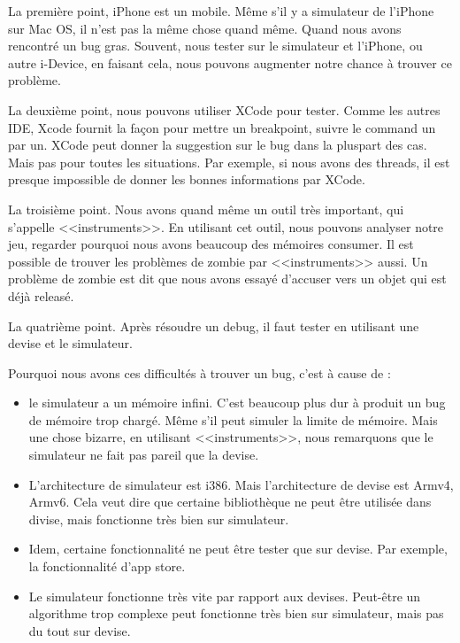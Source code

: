 La première point, iPhone est un mobile. Même s'il y a simulateur de l'iPhone sur Mac OS, il n'est pas la même chose quand même. Quand nous avons rencontré un bug gras. Souvent, nous tester sur le simulateur et l'iPhone, ou autre i-Device, en faisant cela, nous pouvons augmenter notre chance à trouver ce problème. 

La deuxième point, nous pouvons utiliser XCode pour tester. Comme les autres IDE, Xcode fournit la façon pour mettre un breakpoint, suivre le command un par un. XCode peut donner la suggestion sur le bug dans la pluspart des cas. Mais pas pour toutes les situations. Par exemple, si nous avons des threads, il est presque impossible de donner les bonnes informations par XCode. 

La troisième point. Nous avons quand même un outil très important, qui s'appelle <<instruments>>. En utilisant cet outil, nous pouvons analyser notre jeu, regarder pourquoi nous avons beaucoup des mémoires consumer. Il est possible de trouver les problèmes de zombie par <<instruments>> aussi. Un problème de zombie est dit que nous avons essayé d'accuser vers un objet qui est déjà releasé.

La quatrième point. Après résoudre un debug, il faut tester en utilisant une devise et le simulateur. 

Pourquoi nous avons ces difficultés à trouver un bug, c'est à cause de :

\begin{itemize}
	\item le simulateur a un mémoire infini. C'est beaucoup plus dur à produit un bug de mémoire trop chargé. Même s'il peut simuler la limite de mémoire. Mais une chose bizarre, en utilisant <<instruments>>, nous remarquons que le simulateur ne fait pas pareil que la devise. 
	\item L'architecture de simulateur est i386. Mais l'architecture de devise est Armv4, Armv6. Cela veut dire que certaine bibliothèque ne peut être utilisée dans divise, mais fonctionne très bien sur simulateur.
	\item Idem, certaine fonctionnalité ne peut être tester que sur devise. Par exemple, la fonctionnalité d'app store. 
	\item Le simulateur fonctionne très vite par rapport aux devises. Peut-être un algorithme trop complexe peut fonctionne très bien sur simulateur, mais pas du tout sur devise. 
\end{itemize}


